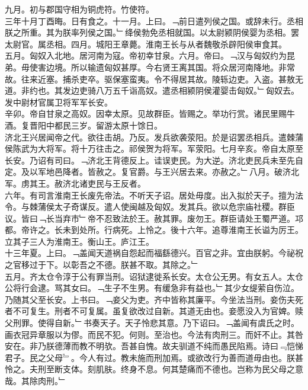\documentclass{zhvt-classic}
\begin{document}
\hspace*{2em}九月。初与郡国守相为铜虎符。竹使符。\\
\hspace*{2em}三年十月丁酉晦。日有食之。十一月。上曰。﹁前日遣列侯之国。或辞未行。丞相朕之所重。其为朕率列侯之国。﹂绛侯勃免丞相就国。以太尉颍阴侯婴为丞相。罢太尉官。属丞相。四月。城阳王章薨。淮南王长与从者魏敬杀辟阳侯审食其。\\
\hspace*{2em}五月。匈奴入北地。居河南为寇。帝初幸甘泉。六月。帝曰。﹁汉与匈奴约为昆弟。毋使害边境。所以输遗匈奴甚厚。今右贤王离其国。将众居河南降地。非常故。往来近塞。捕杀吏卒。驱保塞蛮夷。令不得居其故。陵轹边吏。入盗。甚敖无道。非约也。其发边吏骑八万五千诣高奴。遣丞相颍阴侯灌婴击匈奴。﹂匈奴去。发中尉材官属卫将军军长安。\\
\hspace*{2em}辛卯。帝自甘泉之高奴。因幸太原。见故群臣。皆赐之。举功行赏。诸民里赐牛酒。复晋阳中都民三岁。留游太原十馀日。\\
\hspace*{2em}济北王兴居闻帝之代。欲往击胡。乃反。发兵欲袭荥阳。於是诏罢丞相兵。遣棘蒲侯陈武为大将军。将十万往击之。祁侯贺为将军。军荥阳。七月辛亥。帝自太原至长安。乃诏有司曰。﹁济北王背德反上。诖误吏民。为大逆。济北吏民兵未至先自定。及以军地邑降者。皆赦之。复官爵。与王兴居去来。亦赦之。﹂八月。破济北军。虏其王。赦济北诸吏民与王反者。\\
\hspace*{2em}六年。有司言淮南王长废先帝法。不听天子诏。居处毋度。出入拟於天子。擅为法令。与棘蒲侯太子奇谋反。遣人使闽越及匈奴。发其兵。欲以危宗庙社稷。群臣议。皆曰﹁长当弃市﹂帝不忍致法於王。赦其罪。废勿王。群臣请处王蜀严道。邛都。帝许之。长未到处所。行病死。上怜之。後十六年。追尊淮南王长谥为厉王。立其子三人为淮南王。衡山王。庐江王。\\
\hspace*{2em}十三年夏。上曰。﹁盖闻天道祸自怨起而福繇德兴。百官之非。宜由朕躬。今祕祝之官移过于下。以彰吾之不德。朕甚不取。其除之。﹂\\
\hspace*{2em}五月。齐太仓令淳于公有罪当刑。诏狱逮徙系长安。太仓公无男。有女五人。太仓公将行会逮。骂其女曰。﹁生子不生男。有缓急非有益也。﹂其少女缇萦自伤泣。乃随其父至长安。上书曰。﹁妾父为吏。齐中皆称其廉平。今坐法当刑。妾伤夫死者不可复生。刑者不可复属。虽复欲改过自新。其道无由也。妾愿没入为官婢。赎父刑罪。使得自新。﹂书奏天子。天子怜悲其意。乃下诏曰。﹁盖闻有虞氏之时。画衣冠异章服以为僇。而民不犯。何则。至治也。今法有肉刑三。而奸不止。其咎安在。非乃朕德薄而教不明欤。吾甚自愧。故夫驯道不纯而愚民陷焉。诗曰﹃恺悌君子。民之父母﹄。今人有过。教未施而刑加焉。或欲改行为善而道毋由也。朕甚怜之。夫刑至断支体。刻肌肤。终身不息。何其楚痛而不德也。岂称为民父母之意哉。其除肉刑。﹂\\
\end{document}
